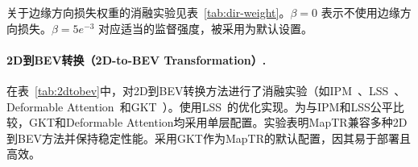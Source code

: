 \documentclass{article} %
\begin{document}
\begin{table}
\vspace{-1.0em}
\centering
{}
\vspace*{-0.25cm}
\caption{关于边缘方向损失权重 $\beta$ 的消融实验。}
\label{tab:dir-weight}
\vspace{-3em}
\end{table}
关于边缘方向损失权重的消融实验见表~\ref{tab:dir-weight}。$\beta = 0$ 表示不使用边缘方向损失。$\beta = 5e^{-3}$ 对应适当的监督强度，被采用为默认设置。
\vspace{1em}


\paragraph{2D到BEV转换（2D-to-BEV Transformation）.}

\begin{table}
\vspace{-1.5em}
\centering
{}
\vspace*{-0.25cm}
\caption{2D到BEV转换方法的消融实验。MapTR兼容多种2D到BEV方法并保持稳定性能。}
\label{tab:2dtobev}
\vspace{-1em}
\end{table}
\vspace{-1em}\vspace{-\parskip}
在表~\ref{tab:2dtobev}中，对2D到BEV转换方法进行了消融实验（如IPM~\citep{ipm}、LSS~\citep{liu2022bevfusion,lss}、Deformable Attention~\citep{bevformer}和GKT~\citep{gkt}）。使用LSS~\citep{liu2022bevfusion}的优化实现。为与IPM和LSS公平比较，GKT和Deformable Attention均采用单层配置。实验表明MapTR兼容多种2D到BEV方法并保持稳定性能。采用GKT作为MapTR的默认配置，因其易于部署且高效。
\end{document}
